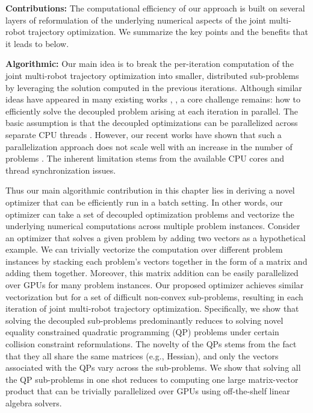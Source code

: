 \noindent \textbf{Contributions:}
The computational efficiency of our approach is built on several layers of reformulation of the underlying numerical aspects of the joint multi-robot trajectory optimization. We summarize the key points and the benefits that it leads to below.
 
\noindent \textbf{Algorithmic:} Our main idea is to break the per-iteration computation of the joint multi-robot trajectory optimization into smaller, distributed sub-problems by leveraging the solution computed in the previous iterations. Although similar ideas have appeared in many existing works \citep{alonso_mora_nips_multi}, \citep{dmpc_carlos_2}, a core challenge remains: how to efficiently solve the decoupled problem arising at each iteration in parallel. The basic assumption is that the decoupled optimizations can be parallelized across separate CPU threads \citep{alonso_mora_nips_multi}. However, our recent works have shown that such a parallelization approach does not scale well with an increase in the number of problems \citep{aks_behavior_ral22}. The inherent limitation stems from the available CPU cores and thread synchronization issues. 

Thus our main algorithmic contribution in this chapter lies in deriving a novel optimizer that can be efficiently run in a batch setting. In other words, our optimizer can take a set of decoupled optimization problems and vectorize the underlying numerical computations across multiple problem instances. Consider an optimizer that solves a given problem by adding two vectors as a hypothetical example. We can trivially vectorize the computation over different problem instances by stacking each problem's vectors together in the form of a matrix and adding them together. Moreover, this matrix addition can be easily parallelized over GPUs for many problem instances. Our proposed optimizer achieves similar vectorization but for a set of difficult non-convex sub-problems, resulting in each iteration of joint multi-robot trajectory optimization. Specifically, we show that solving the decoupled sub-problems predominantly reduces to solving novel equality constrained quadratic programming (QP) problems under certain collision constraint reformulations. The novelty of the QPs stems from the fact that they all share the same matrices (e.g., Hessian), and only the vectors associated with the QPs vary across the sub-problems. We show that solving all the QP sub-problems in one shot reduces to computing one large matrix-vector product that can be trivially parallelized over GPUs using off-the-shelf linear algebra solvers.  


